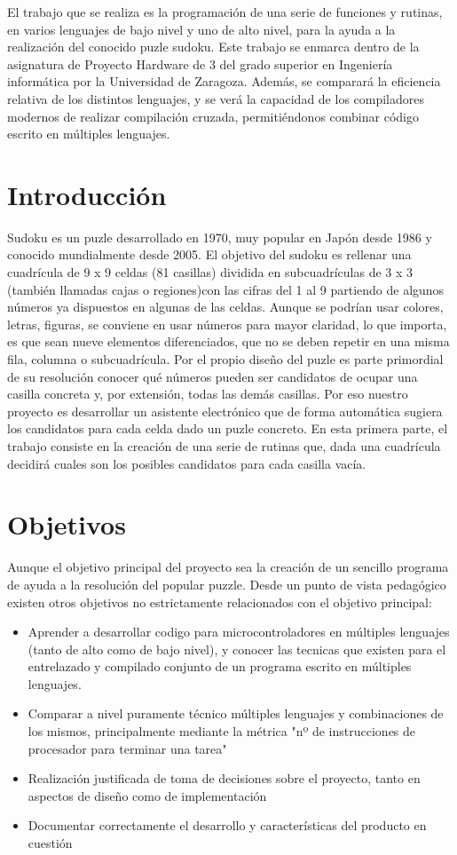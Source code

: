 \documentclass[12pt,letterpaper]{article}
\begin{document}
El trabajo que se realiza es la programación de una serie de
funciones y rutinas, en varios lenguajes de bajo nivel y uno de alto
nivel, para la ayuda a la realización del conocido puzle
sudoku. Este trabajo se enmarca dentro de la asignatura de Proyecto
Hardware de 3 del grado superior en Ingeniería informática por la
Universidad de Zaragoza. Además, se comparará la eficiencia relativa
de los distintos lenguajes, y se verá la capacidad de los
compiladores modernos de realizar compilación cruzada,
permitiéndonos combinar código escrito en múltiples lenguajes.

\section{Introducción}
Sudoku es un puzle desarrollado en 1970, muy popular en Japón desde
1986 y conocido mundialmente desde 2005.  El objetivo del sudoku es
rellenar una cuadrícula de 9 x 9 celdas (81 casillas) dividida en
subcuadrículas de 3 x 3 (también llamadas cajas o regiones)con las
cifras del 1 al 9 partiendo de algunos números ya dispuestos en
algunas de las celdas. Aunque se podrían usar colores, letras,
figuras, se conviene en usar números para mayor claridad, lo que
importa, es que sean nueve elementos diferenciados, que no se deben
repetir en una misma fila, columna o subcuadrícula.  Por el propio
diseño del puzle es parte primordial de su resolución conocer qué
números pueden ser candidatos de ocupar una casilla concreta y, por
extensión, todas las demás casillas.  Por eso nuestro proyecto es
desarrollar un asistente electrónico que de forma automática sugiera
los candidatos para cada celda dado un puzle concreto.  En esta
primera parte, el trabajo consiste en la creación de una serie de
rutinas que, dada una cuadrícula decidirá cuales son los posibles
candidatos para cada casilla vacía.
\section{Objetivos}
Aunque el objetivo principal del proyecto sea la creación de un sencillo
programa de ayuda a la resolución del popular puzzle. Desde un punto de
vista pedagógico existen otros objetivos no estrictamente relacionados
con el objetivo principal:
\begin{itemize}
\item Aprender a desarrollar codigo para microcontroladores en
  múltiples lenguajes (tanto de alto como de bajo nivel), y
  conocer las tecnicas que existen para el entrelazado y compilado
  conjunto de un programa escrito en múltiples lenguajes.
\item Comparar a nivel puramente técnico múltiples lenguajes y
  combinaciones de los mismos, principalmente mediante la métrica
  "nº de instrucciones de procesador para terminar una tarea"
\item Realización justificada de toma de decisiones sobre el proyecto,
  tanto en aspectos de diseño como de implementación
\item Documentar correctamente el desarrollo y características del
  producto en cuestión
\end{itemize}
\end{document}
